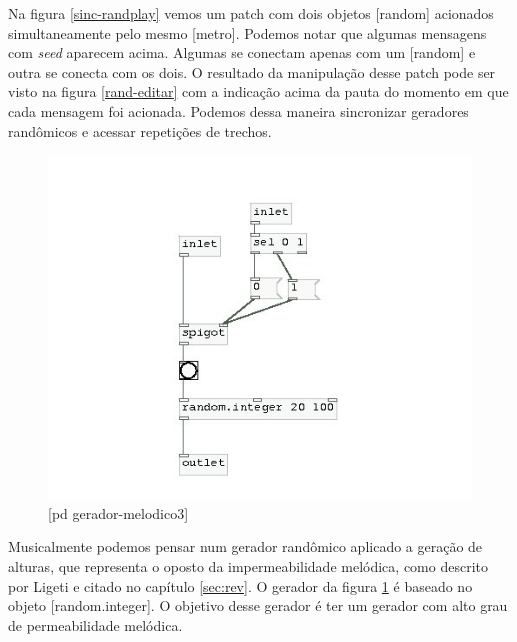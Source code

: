 \documentclass[draft]{ppgmus}
\begin{document}

Na figura \ref{sinc-randplay} vemos um patch com dois objetos [random] acionados simultaneamente
pelo mesmo [metro]. Podemos notar que algumas mensagens com \textit{seed} aparecem acima. Algumas se conectam 
apenas com um [random] e outra se conecta com os dois. O resultado da manipulação desse patch pode ser 
visto na figura \ref{rand-editar} com a indicação acima da pauta do momento em que cada mensagem foi acionada.
Podemos dessa maneira sincronizar geradores randômicos e acessar repetições de trechos.


\begin{figure}
\includegraphics[scale=.6]{gera-melodico3}
\caption{[pd gerador-melodico3]}
\label{gera-melodico3}
\end{figure}  

Musicalmente podemos pensar num gerador randômico aplicado a geração de alturas, 
que representa o oposto da impermeabilidade melódica, como descrito por Ligeti e citado
no capítulo \ref{sec:rev}.
O gerador da figura \ref{gera-melodico3} é baseado no 
objeto [random.integer]. O objetivo desse gerador é 
ter um gerador com alto grau de permeabilidade melódica.
\end{document}
